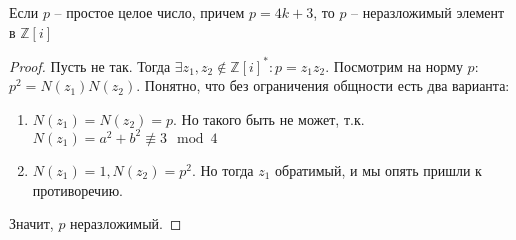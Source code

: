 \documentclass{article}
\begin{document}
\begin{statement}
    Если $p$ -- простое целое число, причем $p = 4k + 3$, то $p$ -- неразложимый элемент в $\mathbb{Z}[i]$
\end{statement}

\begin{proof}
    Пусть не так. Тогда $\exists z_1, z_2 \not \in \mathbb{Z}[i]^*: p = z_1 z_2$. Посмотрим на норму $p$: $p^2 = N(z_1)
    N(z_2)$. Понятно, что без ограничения общности есть два варианта:
    \begin{enumerate}
        \item $N(z_1) = N(z_2) = p$. Но такого быть не может, т.к. $N(z_1) = a^2 + b^2 \not \equiv 3 \mod 4$
        \item $N(z_1) = 1, N(z_2) = p^2$. Но тогда $z_1$ обратимый, и мы опять пришли к противоречию.
    \end{enumerate}
    Значит, $p$ неразложимый.
\end{proof}
\end{document}
